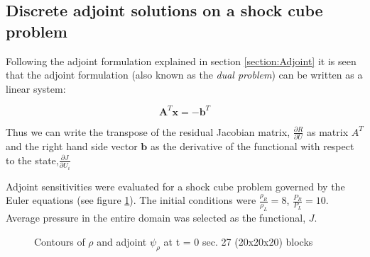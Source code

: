 \subsection{Discrete adjoint solutions on a shock cube problem}
\label{subsection:Discrete_Adjoint}

Following the adjoint formulation explained in section \ref{section:Adjoint} it is seen that the adjoint formulation (also known as the \textit{dual problem}) can be written as a linear system:

\begin{equation}
\mathbf{A}^T\mathbf{x} = -\mathbf{b}^T
\end{equation}

Thus we can write the transpose of the residual Jacobian matrix, $\frac{\partial{R}}{\partial{U}}$ as matrix $A^T$ and the right hand side vector $\mathbf{b}$ as the derivative of the functional with respect to the state,$\frac{\partial{J}}{\partial{U_i}}$\par

Adjoint sensitivities were evaluated for a shock cube problem governed by the Euler equations (see figure \ref{fig:Adjoints}). The initial conditions were $\frac{\rho_R}{\rho_L} = 8$, $\frac{P_R}{P_L} = 10$. Average pressure in the entire domain was selected as the functional, $J$. \par

\begin{figure}[t!]
  \centering
\caption{Contours of $\rho$ and adjoint $\psi_{\rho}$ at t = 0 sec. 27 (20x20x20) blocks} 
\label{fig:Adjoints}      
\end{figure}  